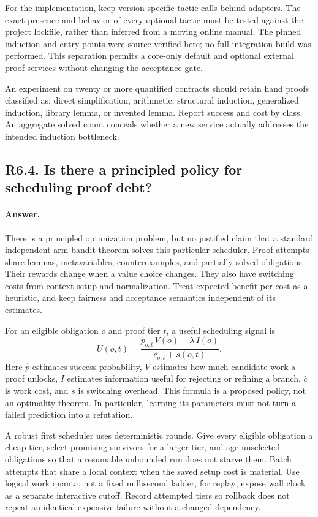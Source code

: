 \documentclass[11pt,a4paper]{article}
\newcommand{\code}[1]{\texttt{\detokenize{#1}}}
\newcommand{\answer}{\paragraph{Answer.}}
\theoremstyle{definition}
\theoremstyle{remark}
\begin{document}
For the implementation, keep version-specific tactic calls behind adapters.
The exact presence and behavior of every optional tactic must be tested against
the project lockfile, rather than inferred from a moving online manual. The
pinned induction and \code{cbv} entry points were source-verified here; no full
integration build was performed. This separation permits a core-only default
and optional external proof services without changing the acceptance gate.

An experiment on twenty or more quantified contracts should retain hand proofs
classified as: direct simplification, arithmetic, structural induction,
generalized induction, library lemma, or invented lemma. Report success and cost
by class. An aggregate solved count conceals whether a new service actually
addresses the intended induction bottleneck.

\subsection{R6.4. Is there a principled policy for scheduling proof debt?}
\answer There is a principled optimization problem, but no justified claim that a
standard independent-arm bandit theorem solves this particular scheduler.
Proof attempts share lemmas, metavariables, counterexamples, and partially solved
obligations. Their rewards change when a value choice changes. They also have
switching costs from context setup and normalization. Treat expected
benefit-per-cost as a heuristic, and keep fairness and acceptance semantics
independent of its estimates.

For an eligible obligation $o$ and proof tier $t$, a useful scheduling signal is
\[
 U(o,t)=\frac{\widehat{p}_{o,t}\,V(o)+\lambda\,I(o)}
                  {\widehat{c}_{o,t}+s(o,t)}.
\]
Here $\widehat{p}$ estimates success probability, $V$ estimates how much candidate
work a proof unlocks, $I$ estimates information useful for rejecting or refining
a branch, $\widehat{c}$ is work cost, and $s$ is switching overhead. This formula
is a proposed policy, not an optimality theorem. In particular, learning its
parameters must not turn a failed prediction into a refutation.

A robust first scheduler uses deterministic rounds. Give every eligible
obligation a cheap tier, select promising survivors for a larger tier, and age
unselected obligations so that a resumable unbounded run does not starve them.
Batch attempts that share a local context when the saved setup cost is material.
Use logical work quanta, not a fixed millisecond ladder, for replay; expose wall
clock as a separate interactive cutoff. Record attempted tiers so rollback does
not repeat an identical expensive failure without a changed dependency.
\end{document}
